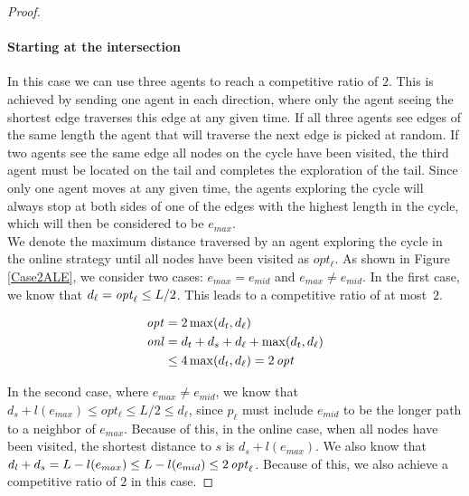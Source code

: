 \begin{proof}
\paragraph*{Starting at the intersection}
In this case we can use three agents to reach a competitive ratio of $2$. This is achieved by sending one agent in each direction, where only the agent seeing the shortest
edge traverses this edge at any given time. If all three agents see edges of the same length the agent that will traverse the next edge is picked at random. If two agents see
the same edge all nodes on the cycle have been visited, the third agent must be located on the tail and completes the exploration of the tail. Since only one agent moves at any
given time, the agents exploring the cycle will always stop at both sides of one of the edges with the highest length in the cycle, which will then be considered to be $e_{max}$.\\
We denote the maximum distance traversed by an agent exploring the cycle in the online strategy until all nodes have been visited as $opt_\ell$. As shown in Figure \ref{Case2ALE}, we consider two cases: 
$e_{max} = e_{mid}$ and $e_{max} \neq e_{mid}$. In the first case, we know that $d_\ell = \mathop{\mathit{opt}}\nolimits_\ell \leq L/2$. This leads to a competitive ratio of at most~$2$. 

\begin{align*}
    \small
    \mathop{\mathit{opt}}\nolimits &= 2\max(d_t, d_\ell)\\
    \mathop{\mathit{onl}}\nolimits &= d_t + d_s + d_\ell + \max(d_t, d_\ell)\\
    &\leq 4\max(d_t, d_\ell) = 2\mathop{\mathit{opt}}\nolimits\\
\end{align*}

In the second case, where $e_{max} \neq e_{mid}$, we know that $d_s + l(e_{max}) \leq opt_\ell \leq L/2 \leq d_\ell$, since $p_\ell$ must include $e_{mid}$ to be the longer path to a neighbor of $e_{max}$.
Because of this, in the online case, when all nodes have been visited, the shortest distance to $s$ is $d_s + l(e_{max})$. We also know that $d_l + d_s = L - l(e_{max}) \leq L - l(e_{mid}) \leq 2\mathop{\mathit{opt}}\nolimits_\ell$.
Because of this, we also achieve a competitive ratio of $2$ in this case.


\end{proof}
